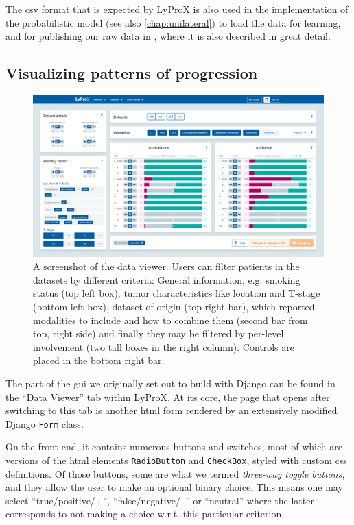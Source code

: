 \documentclass[\relativeRoot/main.tex]{subfiles}
\begin{document}
The \gls{csv} format that is expected by LyProX is also used in the implementation of the probabilistic  model (see also  \cref{chap:unilateral}) to load the data for learning, and for publishing our raw data in , where it is also described in great detail.

\subsection*{Visualizing patterns of progression}
\label{subsec:lyprox:implementation:viewer}

\begin{figure}
    \centering
    \includegraphics[width=1.0\textwidth, frame]{figures/data_viewer.png}
    \caption[
        Screenshot of the data viewer dashboard
    ]{
        A screenshot of the data viewer. Users can filter patients in the datasets by different criteria: General information, e.g. smoking status (top left box), tumor characteristics like location and T-stage (bottom left box), dataset of origin (top right bar), which reported modalities to include and how to combine them (second bar from top, right side) and finally they may be filtered by per-level involvement (two tall boxes in the right column). Controls are placed in the bottom right bar.
    }
    \label{fig:lyprox:data_viewer}
\end{figure}

The part of the \gls{gui} we originally set out to build with Django can be found in the ``Data Viewer'' tab within LyProX. At its core, the page that opens after switching to this tab is another \acrshort{html} form rendered by an extensively modified Django \texttt{Form} class.

On the front end, it contains numerous buttons and switches, most of which are versions of the \acrshort{html} elements \texttt{RadioButton} and \texttt{CheckBox}, styled with custom \acrshort{css} definitions. Of those buttons, some are what we termed \emph{three-way toggle buttons}, and they allow the user to make an optional binary choice. This means one may select ``true/positive/+'', ``false/negative/--'' or ``neutral'' where the latter corresponds to not making a choice w.r.t. this particular criterion.
\end{document}
